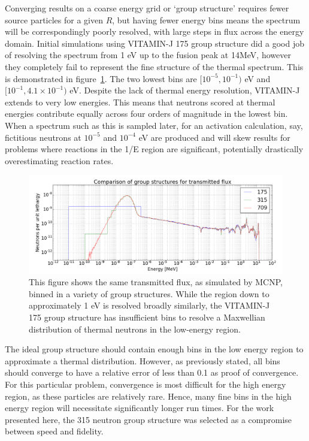Converging results on a coarse energy grid or `group structure' requires fewer source particles for a given $R$, but having fewer energy bins means the spectrum will be correspondingly poorly resolved, with large steps in flux across the energy domain. Initial simulations using VITAMIN-J 175 group structure did a good job of resolving the spectrum from 1 eV up to the fusion peak at 14MeV, however they completely fail to represent the fine structure of the thermal spectrum. This is demonstrated in figure~\ref{fig:neutron_group_comparison}. The two lowest bins are $[10^{-5},10^{-1})$ eV and $[10^{-1},4.1\times10^{-1})$ eV. Despite the lack of thermal energy resolution, VITAMIN-J extends to very low energies. This means that neutrons scored at thermal energies contribute equally across four orders of magnitude in the lowest bin. When a spectrum such as this is sampled later, for an activation calculation, say, fictitious neutrons at $10^{-5}$ and $10^{-4}$ eV are produced and will skew results for problems where reactions in the 1/E region are significant, potentially drastically overestimating reaction rates. 

\begin{figure}[H]
  \includegraphics[width=\textwidth]{shield_flux_by_group.png}
  \caption{This figure shows the same transmitted flux, as simulated by MCNP, binned in a variety of group structures. While the region down to approximately 1 eV is resolved broadly similarly, the VITAMIN-J 175 group structure has insufficient bins to resolve a Maxwellian distribution of thermal neutrons in the low-energy region.}
  \label{fig:neutron_group_comparison}
\end{figure}

The ideal group structure should contain enough bins in the low energy region to approximate a thermal distribution. However, as previously stated, all bins should converge to have a relative error of less than 0.1 as proof of convergence. For this particular problem, convergence is most difficult for the high energy region, as these particles are relatively rare. Hence, many fine bins in the high energy region will necessitate significantly longer run times. For the work presented here, the 315 neutron group structure was selected as a compromise between speed and fidelity.

